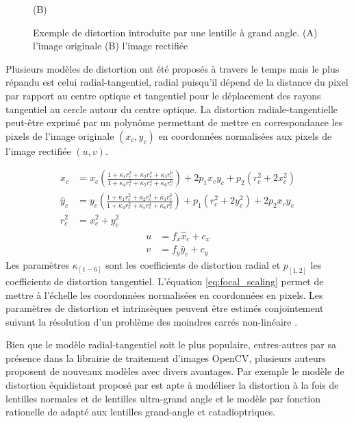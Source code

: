 \begin{figure}[htp]
\begin{minipage}{0.4\textwidth}
    (B)
  \end{minipage}
  \caption{Exemple de distortion introduite par une lentille à grand angle. (A) l'image originale (B) l'image rectifiée}
  \label{fig:distortion}
\end{figure}

Plusieurs modèles de distortion ont été proposés à travers le temps mais le plus répandu est celui radial-tangentiel, radial puisqu'il dépend de la distance du pixel par rapport au centre optique et tangentiel pour le déplacement des rayons tangentiel au cercle autour du centre optique. La distortion radiale-tangentielle peut-être exprimé par un polynôme permettant de mettre en correspondance les pixels de l'image originale $(x_c, y_c)$ en coordonnées normalisées aux pixels de l'image rectifiée $(u, v)$.

\begin{equation}
\begin{aligned}
  \hat{x}_c &= x_c\left(\frac{1 + \kappa_1r_c^2 + \kappa_2r_c^4 + \kappa_3r_c^6}{1 + \kappa_4r_c^2 + \kappa_5r_c^4 + \kappa_6r_c^6}\right) + 2p_1 x_c y_c + p_2(r_c^2 + 2 x_c^2) \\
  \hat{y}_c &= y_c\left(\frac{1 + \kappa_1r_c^2 + \kappa_2r_c^4 + \kappa_3r_c^6}{1 + \kappa_4r_c^2 + \kappa_5r_c^4 + \kappa_6r_c^6}\right) + p_1 (r_c^2 + 2 y_c^2) + 2p_2 x_c y_c \\
  r_c^2     &= x_c^2 + y_c^2
  \label{eq:rectification}
\end{aligned}
\end{equation}
\begin{equation}
\begin{aligned}
  u & = f_x \hat{x}_c + c_x\\
  v &= f_y \hat{y}_c + c_y
  \label{eq:focal_scaling}
\end{aligned}
\end{equation}
Les paramètres $\kappa_{[1-6]}$ sont les coefficients de distortion radial et $p_{[1,2]}$ les coefficients de distortion tangentiel. L'équation \ref{eq:focal_scaling} permet de mettre à l'échelle les coordonnées normalisées en coordonnées en pixels. Les paramètres de distortion et intrinsèques peuvent être estimés conjointement suivant la résolution d'un problème des moindres carrés non-linéaire \citep{Zhang2000}.

Bien que le modèle radial-tangentiel soit le plus populaire, entres-autres par sa présence dans la librairie de traitement d'images OpenCV, plusieurs auteurs proposent de nouveaux modèles avec divers avantages. Par exemple le modèle de distortion équidistant proposé par \citep{Kannala2006} est apte à modéliser la distortion à la fois de lentilles normales et de lentilles ultra-grand angle et le modèle par fonction rationelle de \citep{Claus2005} adapté aux lentilles grand-angle et catadioptriques.

